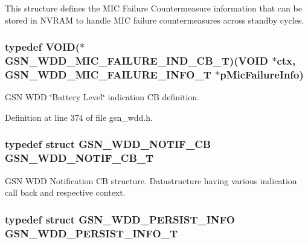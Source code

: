 This structure defines the MIC Failure Countermeasure information that can be stored in NVRAM to handle MIC failure countermeasures across standby cycles. \hypertarget{a00677_ga7ccb461a81661940f165a9e3d1812421}{
\subsubsection[{GSN\_\-WDD\_\-MIC\_\-FAILURE\_\-IND\_\-CB\_\-T}]{\setlength{\rightskip}{0pt plus 5cm}typedef VOID($\ast$ {\bf GSN\_\-WDD\_\-MIC\_\-FAILURE\_\-IND\_\-CB\_\-T})(VOID $\ast$ctx, {\bf GSN\_\-WDD\_\-MIC\_\-FAILURE\_\-INFO\_\-T} $\ast$pMicFailureInfo)}}
\label{a00677_ga7ccb461a81661940f165a9e3d1812421}


GSN WDD \char`\"{}Battery Level\char`\"{} indication CB definition. 



Definition at line 374 of file gsn\_\-wdd.h.

\hypertarget{a00677_gab57828609030c2fd2947208559792aec}{
\subsubsection[{GSN\_\-WDD\_\-NOTIF\_\-CB\_\-T}]{\setlength{\rightskip}{0pt plus 5cm}typedef struct {\bf GSN\_\-WDD\_\-NOTIF\_\-CB} {\bf GSN\_\-WDD\_\-NOTIF\_\-CB\_\-T}}}
\label{a00677_gab57828609030c2fd2947208559792aec}


GSN WDD Notification CB structure. Datastructure having various indication call back and respective context. 

\hypertarget{a00677_gaf6471274c5e1eeaf77be72eab076204e}{
\subsubsection[{GSN\_\-WDD\_\-PERSIST\_\-INFO\_\-T}]{\setlength{\rightskip}{0pt plus 5cm}typedef struct {\bf GSN\_\-WDD\_\-PERSIST\_\-INFO}  {\bf GSN\_\-WDD\_\-PERSIST\_\-INFO\_\-T}}}
\label{a00677_gaf6471274c5e1eeaf77be72eab076204e}


